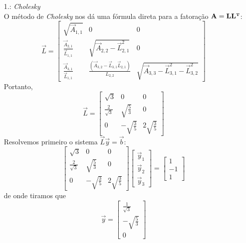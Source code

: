 \documentclass{homework}
\begin{document}
		\begin{enumerate}[wide, leftmargin=80pt]
			\item[1.: \textit{Cholesky}]~\\
			
			O método de \textit{Cholesky} nos dá uma fórmula direta para a fatoração $\mathbf{A} = \mathbf{L}\mathbf{L}^{\text{\bfseries\tiny T}}$:
			$$\vec{L} = {\begin{bmatrix}
				{\sqrt {\vec{A}_{1,1}}} & 0 & 0\\
				\frac{\vec{A}_{2,1}}{\vec{L}_{1,1}} & {\sqrt {\vec{A}_{2,2}-\vec{L}_{2,1}^{2}}} & 0\\
				\frac{\vec{A}_{3,1}}{\vec{L}_{1,1}} & \frac{\left(\vec{A}_{3,2}-\vec{L}_{3,1}\vec{L}_{2,1}\right)}{L_{2,2}} &{\sqrt {\vec{A}_{3,3}-\vec{L}_{3,1}^{2}-\vec{L}_{3,2}^{2}}}
			\end{bmatrix}}$$
			Portanto,
			$$\vec{L} = {\begin{bmatrix}
				\sqrt{3} & 0& 0\\
				\frac{2}{\sqrt{3}} & \sqrt {\frac{5}{3}} & 0\\
				0 &- \sqrt {\frac{3}{5}} & 2\sqrt {\frac{3}{5}}
				\end{bmatrix}}$$
			Resolvemos primeiro o sistema $\vec{L}\vec{y} = \vec{b}$:
			$$\begin{bmatrix}
			\sqrt{3} & 0& 0\\
			\frac{2}{\sqrt{3}} & \sqrt {\frac{5}{3}} & 0\\
			0 &- \sqrt {\frac{3}{5}} & 2\sqrt {\frac{3}{5}}
			\end{bmatrix} \begin{bmatrix}
			\vec{y}_1\\
			\vec{y}_2\\
			\vec{y}_3
			\end{bmatrix} = \begin{bmatrix}
			1\\
			-1\\
			1
			\end{bmatrix}
			$$
			de onde tiramos que $$\vec{y} = \begin{bmatrix}
			\frac{1}{\sqrt{3}}\\
			-\sqrt{\frac{5}{3}}\\
			0
			\end{bmatrix}$$
			

\end{enumerate}
\end{document}
